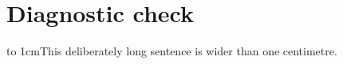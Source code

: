 \documentclass{article}
\begin{document}
\section{Diagnostic check}
\hbox to 1cm{This deliberately long sentence is wider than one centimetre.}
\end{document}
